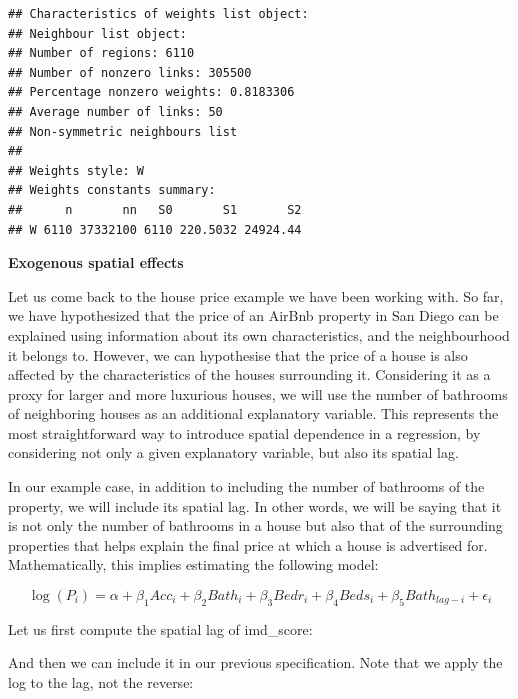 \documentclass[
]{book}
\newenvironment{Shaded}{\begin{snugshade}}{\end{snugshade}}
\newcommand{\FunctionTok}[1]{\textcolor[rgb]{0.00,0.00,0.00}{#1}}
\newcommand{\NormalTok}[1]{#1}
\newcommand{\OtherTok}[1]{\textcolor[rgb]{0.56,0.35,0.01}{#1}}
\newcommand{\SpecialCharTok}[1]{\textcolor[rgb]{0.00,0.00,0.00}{#1}}
\begin{document}
\begin{verbatim}
## Characteristics of weights list object:
## Neighbour list object:
## Number of regions: 6110 
## Number of nonzero links: 305500 
## Percentage nonzero weights: 0.8183306 
## Average number of links: 50 
## Non-symmetric neighbours list
## 
## Weights style: W 
## Weights constants summary:
##      n       nn   S0       S1       S2
## W 6110 37332100 6110 220.5032 24924.44
\end{verbatim}

\textbf{Exogenous spatial effects}

Let us come back to the house price example we have been working with. So far, we have hypothesized that the price of an AirBnb property in San Diego can be explained using information about its own characteristics, and the neighbourhood it belongs to. However, we can hypothesise that the price of a house is also affected by the characteristics of the houses surrounding it. Considering it as a proxy for larger and more luxurious houses, we will use the number of bathrooms of neighboring houses as an additional explanatory variable. This represents the most straightforward way to introduce spatial dependence in a regression, by considering not only a given explanatory variable, but also its spatial lag.

In our example case, in addition to including the number of bathrooms of the property, we will include its spatial lag. In other words, we will be saying that it is not only the number of bathrooms in a house but also that of the surrounding properties that helps explain the final price at which a house is advertised for. Mathematically, this implies estimating the following model:

\[
\log(P_i) = \alpha + \beta_1 Acc_i + \beta_2 Bath_i + \beta_3 Bedr_i + \beta_4 Beds_i+ \beta_5 Bath_{lag-i} + \epsilon_i
\]

Let us first compute the spatial lag of imd\_score:

\begin{Shaded}
\end{Shaded}

And then we can include it in our previous specification. Note that we apply the log to the lag, not the reverse:
\end{document}
